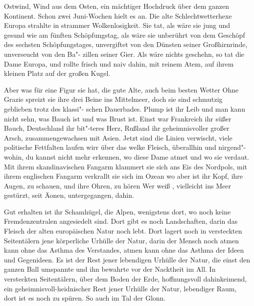 

Ostwind, Wind aus dem Osten, ein mächtiger Hochdruck über
dem ganzen Kontinent. Schon zwei Juni-Wochen hielt es an.
Die alte Schlechtwetterhexe Europa strahlte in strammer
Wolkenlosigkeit. Sie tat, als wäre sie jung und gesund wie
am fünften Schöpfungstag, als wäre sie unberührt von dem
Geschöpf des sechsten Schöpfungstages, unvergiftet von den
Dünsten seiner Großhirnrinde, unverseucht von den Ba"-%
zillen seiner Gier. Als wäre nichts geschehn, so tat die Dame
Europa, und rollte frisch und naiv dahin, mit reinem Atem,
auf ihrem kleinen Platz auf der großen Kugel.

Aber was für eine Figur sie hat, die gute Alte, auch beim
besten Wetter\ausr{} Ohne Grazie spreizt sie ihre drei Beine ins
Mittelmeer, doch sie sind schmutzig geblieben trotz des klassi"-%
schen Dauerbades. Plump ist ihr Leib und man kann nicht
sehn, was Bauch ist und was Brust ist. Einst war Frankreich
ihr süßer Bauch, Deutschland ihr bit"-teres Herz, Rußland ihr
geheimnisvoller großer Arsch, zusammengewachsen mit Asien.
Jetzt sind die Linien verwischt, viele politische Fettfalten
laufen wirr über das welke Fleisch, überallhin und nirgend"-%
wohin, du kannst nicht mehr erkennen, wo diese Dame atmet
und wo sie verdaut. Mit ihrem skandinavischen Fangarm
klammert sie sich ans Eis des Nordpols, mit ihrem englischen
Fangarm verkrallt sie sich im Ozean\dopp{} wo aber ist ihr Kopf,
ihre Augen, zu schauen, und ihre Ohren, zu hören\frag{} Wer weiß%
\eingriff{eS7-1}{weiß, ] weiß},
vielleicht ins Meer gestürzt, seit Äonen, untergegangen,
dahin.

Gut erhalten ist ihr Schamhügel, die Alpen, wenigstens dort,
wo noch keine Fremdenzentralen angesiedelt sind. Dort gibt
es noch Landschaften, darin das Fleisch der alten europäischen
Natur noch lebt. Dort lagert noch in versteckten Seitentälern
jene körperliche Urhülle der Natur, darin der Mensch noch
atmen kann ohne das Asthma des Verstandes, atmen kann
ohne das Asthma der Ideen und Gegenideen. Es ist der Rest
jener lebendigen Urhülle der Natur, die einst den ganzen
Ball umspannte und ihn bewahrte vor der Nacktheit im All.
In versteckten Seitentälern, über dem Boden der Erde,
hoffnungsvoll dahinkeimend, ein geheimnisvoll-heidnischer
Rest jener Urhülle der Natur, lebendiger Raum, dort ist es
noch zu spüren. So auch im Tal der Glonn.

